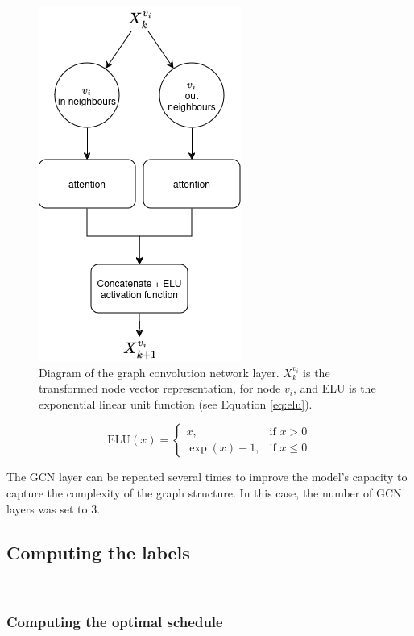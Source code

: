 \begin{figure}
    \centering
    \includegraphics[width=0.5\linewidth]{images/gcn_update_aggregate_diagram.png}
    \caption{Diagram of the graph convolution network layer. $X^{v_i}_k$ is the transformed node vector representation,
    for node $v_i$,
    and ELU is the exponential linear unit function (see Equation \ref{eq:elu}).}
    \label{fig:update_aggregate_diagram}
\end{figure}

\begin{equation}
\text{ELU}(x) = 
\begin{cases}
x, & \text{if } x > 0 \\
\exp(x) - 1, & \text{if } x \leq 0
\end{cases}
\label{eq:elu}
\end{equation}


The GCN layer can be repeated several times 
to improve the model's capacity to
capture the complexity of the graph structure.
In this case, the number of GCN layers was set to 3.

\subsection{Computing the labels}
~
\label{sec:ilp_calculation}

\subsubsection{Computing the optimal schedule}

